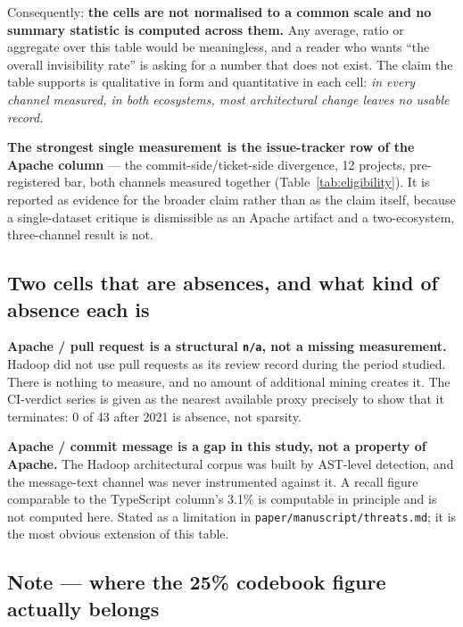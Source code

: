 \documentclass[11pt,a4paper]{article}
\begin{document}
Consequently: \textbf{the cells are not normalised to a common scale and no summary statistic is computed across them.} Any average, ratio or aggregate over this table would be meaningless, and a reader who wants ``the overall invisibility rate'' is asking for a number that does not exist. The claim the table supports is qualitative in form and quantitative in each cell: \emph{in every channel measured, in both ecosystems, most architectural change leaves no usable record.}



\textbf{The strongest single measurement is the issue-tracker row of the Apache column} --- the commit-side/ticket-side divergence, 12 projects, pre-registered bar, both channels measured together (Table~\ref{tab:eligibility}). It is reported as evidence for the broader claim rather than as the claim itself, because a single-dataset critique is dismissible as an Apache artifact and a two-ecosystem, three-channel result is not.



\subsection*{Two cells that are absences, and what kind of absence each is}




\textbf{Apache / pull request is a structural \texttt{n/\allowbreak{}a}, not a missing measurement.} Hadoop did not use pull requests as its review record during the period studied. There is nothing to measure, and no amount of additional mining creates it. The CI-verdict series is given as the nearest available proxy precisely to show that it terminates: 0 of 43 after 2021 is absence, not sparsity.



\textbf{Apache / commit message is a gap in this study, not a property of Apache.} The Hadoop architectural corpus was built by AST-level detection, and the message-text channel was never instrumented against it. A recall figure comparable to the TypeScript column's 3.1\% is computable in principle and is not computed here. Stated as a limitation in \texttt{paper/\allowbreak{}manuscript/\allowbreak{}threats.\allowbreak{}md}; it is the most obvious extension of this table.



\subsection*{Note --- where the 25\% codebook figure actually belongs}
\end{document}
